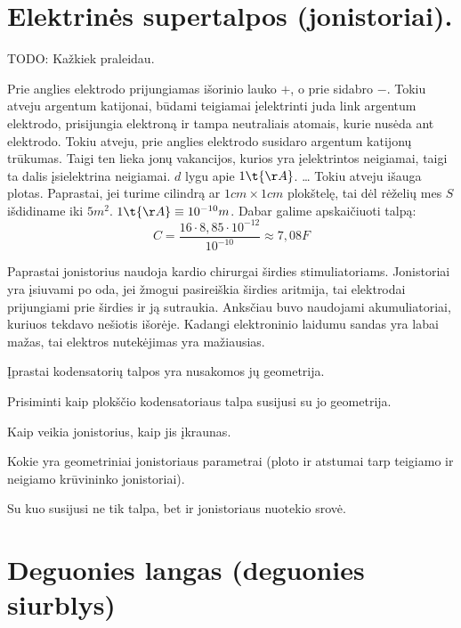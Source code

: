 \section{Elektrinės supertalpos (jonistoriai).}

TODO: Kažkiek praleidau.

Prie anglies elektrodo prijungiamas išorinio lauko $+$, o prie sidabro
$-$. Tokiu atveju argentum katijonai, būdami teigiamai įelektrinti
juda link argentum elektrodo, prisijungia elektroną ir tampa
neutraliais atomais, kurie nusėda ant elektrodo. Tokiu atveju, prie
anglies elektrodo susidaro argentum katijonų trūkumas. Taigi ten
lieka jonų vakancijos, kurios yra įelektrintos neigiamai, taigi
ta dalis įsielektrina neigiamai. $d$ lygu apie $1 \t{Å}$. … Tokiu atveju
išauga plotas. Paprastai, jei turime cilindrą ar $1 cm \times 1 cm$
plokštelę, tai dėl rėželių mes $S$ išdidiname iki $5m^{2}$.
$1\t{Å} \equiv 10^{-10} m$. Dabar galime apskaičiuoti talpą:
\begin{equation*}
  C = \frac{16 \cdot 8,85 \cdot 10^{-12}}{10^{-10}}
  \approx 7,08 F
\end{equation*}

Paprastai jonistorius naudoja kardio chirurgai širdies stimuliatoriams.
Jonistoriai yra įsiuvami po oda, jei žmogui pasireiškia širdies aritmija,
tai elektrodai prijungiami prie širdies ir ją sutraukia. Anksčiau
buvo naudojami akumuliatoriai, kuriuos tekdavo nešiotis išorėje.
Kadangi elektroninio laidumu sandas yra labai mažas, tai elektros
nutekėjimas yra mažiausias.

\begin{remember}
  \item Įprastai kodensatorių talpos yra nusakomos jų geometrija.
  \item Prisiminti kaip plokščio kodensatoriaus talpa susijusi su
    jo geometrija.
  \item Kaip veikia jonistorius, kaip jis įkraunas.
  \item Kokie yra geometriniai jonistoriaus parametrai (ploto ir atstumai
    tarp teigiamo ir neigiamo krūvininko jonistoriai).
  \item Su kuo susijusi ne tik talpa, bet ir jonistoriaus nuotekio
    srovė.
\end{remember}

\section{Deguonies langas (deguonies siurblys)}

